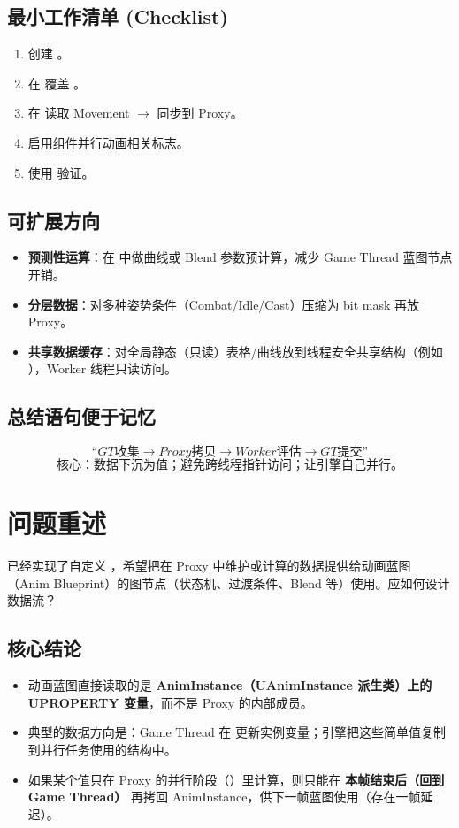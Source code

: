 \documentclass[10pt,openright,oneside,CJKmath]{MyBook}
\begin{document}
\subsection{最小工作清单 (Checklist)}
\begin{enumerate}
  \item 创建 。
  \item 在  覆盖 。
  \item 在  读取 Movement $\rightarrow$ 同步到 Proxy。
  \item 启用组件并行动画相关标志。
  \item 使用  验证。
\end{enumerate}

\subsection{可扩展方向}
\begin{itemize}
  \item \textbf{预测性运算}：在  中做曲线或 Blend 参数预计算，减少 Game Thread 蓝图节点开销。
  \item \textbf{分层数据}：对多种姿势条件（Combat/Idle/Cast）压缩为 bit mask 再放 Proxy。
  \item \textbf{共享数据缓存}：对全局静态（只读）表格/曲线放到线程安全共享结构（例如 ），Worker 线程只读访问。
\end{itemize}

\subsection{总结语句便于记忆}
\[
{“GT 收集  \rightarrow Proxy 拷贝  \rightarrow Worker 评估  \rightarrow GT 提交”}
\]
\[
{核心：数据下沉为值；避免跨线程指针访问；让引擎自己并行。}
\]
\section{问题重述}
已经实现了自定义 ，希望把在 Proxy 中维护或计算的数据提供给动画蓝图（Anim Blueprint）的图节点（状态机、过渡条件、Blend 等）使用。应如何设计数据流？

\subsection{核心结论}
\begin{itemize}
  \item 动画蓝图直接读取的是 \textbf{AnimInstance（UAnimInstance 派生类）上的 UPROPERTY 变量}，而不是 Proxy 的内部成员。
  \item 典型的数据方向是：Game Thread 在  更新实例变量；引擎把这些简单值复制到并行任务使用的结构中。
  \item 如果某个值只在 Proxy 的并行阶段（）里计算，则只能在 \textbf{本帧结束后（回到 Game Thread）} 再拷回 AnimInstance，供下一帧蓝图使用（存在一帧延迟）。
\end{itemize}
\end{document}
